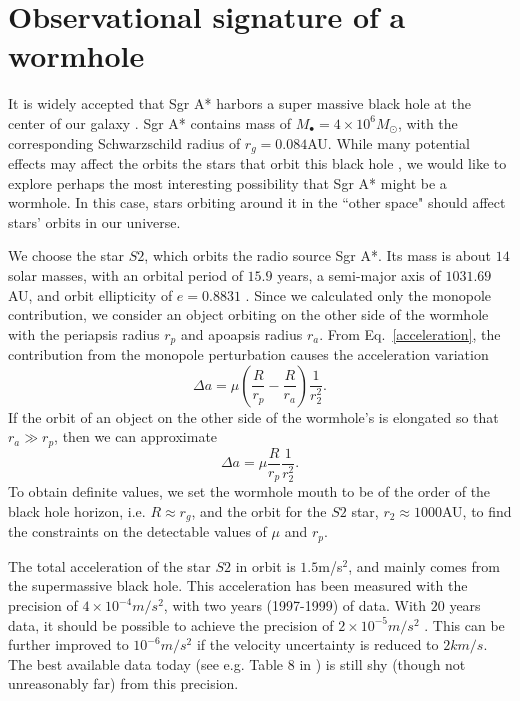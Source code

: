\documentclass[prd, amsfonts, twocolumn, nofootinbib, showpacs]{revtex4}
\begin{document}
\section{ Observational signature of a wormhole}
It is widely accepted that Sgr A* harbors a super massive black hole at the center of our galaxy \cite{1977ApJ...218L.103W,1996ApJ...472..153G,2007gsbh.book.....M,Ghez:2008ms,Schodel:2002vg,2009ApJ...707L.114G,Gillessen:2008qv,2007ApJ...659..378R}. Sgr A* contains mass of $M_\bullet=4\times 10^6 M_\odot$, with the corresponding Schwarzschild radius of $r_g=0.084$AU. While many potential effects may affect the orbits the stars that orbit this black hole \cite{Iorio:2010hw}, we would like to explore perhaps the most interesting possibility that Sgr A* might be a wormhole. In this case, stars orbiting around it in the ``other space" should affect stars' orbits in our universe.

We choose the star $S2$, which orbits the radio source Sgr A*. Its mass is about $14$ solar masses, with an orbital period of $15.9$ years, a semi-major axis of $1031.69$ AU, and orbit ellipticity of $e=0.8831$  \cite{2009ApJ...707L.114G}.
Since we  calculated only the monopole contribution, we consider an object orbiting on the other side of the wormhole with the periapsis radius $r_p$ and apoapsis radius $r_a$. From Eq.~\eqref{acceleration}, the contribution from the monopole perturbation causes the acceleration variation
\begin{equation} \label{deltaa}
\Delta a =\mu \left(\frac{R}{r_p}-\frac{R}{r_a}\right)\frac{1}{r_2^2} .
\end{equation}
If the orbit of an object on the other side of  the wormhole's  is elongated so that $r_a\gg r_p$, then we can approximate
\begin{equation}
\Delta a =\mu \frac{R}{r_p}\frac{1}{r_2^2} .
\end{equation}
To obtain definite values, we set the wormhole mouth to be of the order of the black hole horizon, i.e. $R\approx r_g$, and the orbit for the $S2$ star, $r_2\approx 1000$AU, to find the constraints on the detectable values of $\mu$ and $r_p$.

The total acceleration of the star $S2$ in orbit is $1.5$m/s$^2$, and mainly comes from the supermassive black hole. 
This acceleration has been measured with the precision of $4\times 10^{-4} m/s^2$, with two years (1997-1999) of data\cite{Iorio:2010hw,Ghez:2000ay}. With $20$ years data, it should be possible to achieve the precision of $2\times 10^{-5} m/s^2$ \cite{Iorio:2010hw,2009ApJ...700..137R}. This can be further improved to $10^{-6} m/s^2$ if the velocity uncertainty is reduced to $2 km/s$\cite{Iorio:2010hw,Ghez:2008ms,Gould:2002hf}. The best available data today (see e.g. Table 8 in \cite{20years}) is still shy (though not unreasonably far) from this precision.
\end{document}
